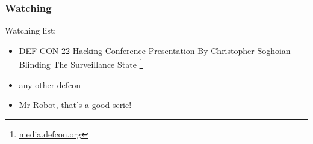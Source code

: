   \begin{frame}
    \frametitle{Watching}
    \begin{block}{Watching list:}
      \begin{itemize}
        \item DEF CON 22 Hacking Conference Presentation By Christopher Soghoian - Blinding The Surveillance State
        \footnote{{\color{blue}\href{https://media.defcon.org/DEF CON 22/DEF CON 22 video and slides/}{media.defcon.org}}}
        \item any other defcon
        \item Mr Robot, that's a good serie!
      \end{itemize}
    \end{block}
  \end{frame}
